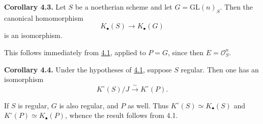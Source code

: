 \textbf{Corollary 4.3.} Let $S$ be a noetherian scheme and let $G=\mathrm{GL}(n)_S$. Then the canonical homomorphism
\[
 K_\bullet(S)\longrightarrow K_\bullet(G)
\]
is an isomorphism.

This follows immediately from \hyperlink{sga6.e09.prop.4-1}{4.1}, applied to $P=G$, since then $E=\mathcal O_S^n$.

\textbf{Corollary 4.4.} Under the hypotheses of \hyperlink{sga6.e09.prop.4-1}{4.1}, suppose $S$ regular. Then one has an isomorphism
\[
 K^\circ(S)/J\xrightarrow{\sim}K^\circ(P).
\]

If $S$ is regular, $G$ is also regular, and $P$ as well. Thus $K^\circ(S)\simeq K_\bullet(S)$ and $K^\circ(P)\simeq K_\bullet(P)$, whence the result follows from 4.1.
